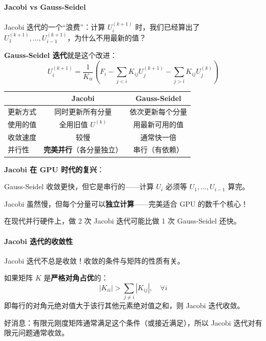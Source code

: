 \paragraph{Jacobi vs Gauss-Seidel}

Jacobi 迭代的一个“浪费”：计算 $U_i^{(k+1)}$ 时，我们已经算出了 $U_1^{(k+1)}, \ldots, U_{i-1}^{(k+1)}$，为什么不用最新的值？

\textbf{Gauss-Seidel 迭代}就是这个改进：
\[
U_i^{(k+1)} = \frac{1}{K_{ii}} \left( F_i - \sum_{j < i} K_{ij} U_j^{(k+1)} - \sum_{j > i} K_{ij} U_j^{(k)} \right)
\]

\begin{center}
\begin{tabular}{l|c|c}
\toprule
& \textbf{Jacobi} & \textbf{Gauss-Seidel} \\
\midrule
更新方式 & 同时更新所有分量 & 依次更新每个分量 \\
使用的值 & 全用旧值 $U^{(k)}$ & 用最新可用的值 \\
收敛速度 & 较慢 & 通常快一倍 \\
并行性 & \textbf{完美并行}（各分量独立） & 串行（有依赖） \\
\bottomrule
\end{tabular}
\end{center}

\begin{insightbox}
\textbf{Jacobi 在 GPU 时代的复兴}：

Gauss-Seidel 收敛更快，但它是串行的——计算 $U_i$ 必须等 $U_1, \ldots, U_{i-1}$ 算完。

Jacobi 虽然慢，但每个分量可以\textbf{独立计算}——完美适合 GPU 的数千个核心！

在现代并行硬件上，做 2 次 Jacobi 迭代可能比做 1 次 Gauss-Seidel 还快。
\end{insightbox}

\paragraph{Jacobi 迭代的收敛性}

Jacobi 迭代不总是收敛！收敛的条件与矩阵的性质有关。

\begin{keytheorem}[title=Jacobi 收敛的充分条件]
如果矩阵 $K$ 是\textbf{严格对角占优}的：
\[
|K_{ii}| > \sum_{j \neq i} |K_{ij}|, \quad \forall i
\]
即每行的对角元绝对值大于该行其他元素绝对值之和，则 Jacobi 迭代收敛。
\end{keytheorem}

好消息：有限元刚度矩阵通常满足这个条件（或接近满足），所以 Jacobi 迭代对有限元问题通常收敛。

